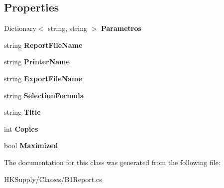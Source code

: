 \subsection*{Properties}
\begin{DoxyCompactItemize}
\item 
\mbox{\label{class_h_k_supply_1_1_reports_1_1_b1_report_a300e48b29b28cbcdce905c946f3d9e66}} 
Dictionary$<$ string, string $>$ {\bfseries Parametros}
\item 
\mbox{\label{class_h_k_supply_1_1_reports_1_1_b1_report_a8d1bad703e299a7a3fcbea12ac9dcc68}} 
string {\bfseries Report\+File\+Name}
\item 
\mbox{\label{class_h_k_supply_1_1_reports_1_1_b1_report_aff33084e412d5df825931ae2db2f2761}} 
string {\bfseries Printer\+Name}
\item 
\mbox{\label{class_h_k_supply_1_1_reports_1_1_b1_report_ab9c1cc61ab4f72c0d116b3241aa06b06}} 
string {\bfseries Export\+File\+Name}
\item 
\mbox{\label{class_h_k_supply_1_1_reports_1_1_b1_report_ad3972bbf39f6ea7c194793a995253065}} 
string {\bfseries Selection\+Formula}
\item 
\mbox{\label{class_h_k_supply_1_1_reports_1_1_b1_report_ac9ae0cc083c234b9ddc667db6b134b1c}} 
string {\bfseries Title}
\item 
\mbox{\label{class_h_k_supply_1_1_reports_1_1_b1_report_ab187bdcb46e8e6b6c9a160fd5c344bd7}} 
int {\bfseries Copies}
\item 
\mbox{\label{class_h_k_supply_1_1_reports_1_1_b1_report_a5c4037d6a85a3f9904481867bb826d15}} 
bool {\bfseries Maximized}
\end{DoxyCompactItemize}


The documentation for this class was generated from the following file\+:\begin{DoxyCompactItemize}
\item 
H\+K\+Supply/\+Classes/B1\+Report.\+cs\end{DoxyCompactItemize}
